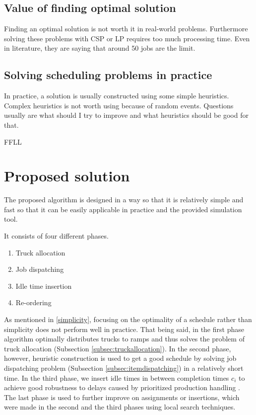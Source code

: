 \documentclass{ctuthesis}
\begin{document}
\section{Value of finding optimal solution}
Finding an optimal solution is not worth it in real-world problems. Furthermore solving these problems with CSP or LP requires too much processing time. Even in literature, they are saying that around 50 jobs are the limit. 
\section{Solving scheduling problems in practice}
In practice, a solution is usually constructed using some simple heuristics. Complex heuristics is not worth using because of random events. Questions usually are what should I try to improve and what heuristics should be good for that. 

FFLL 


\chapter{Proposed solution}
\label{ch:Proposed solution}

The proposed algorithm is designed in a way so that it is relatively simple and fast so that it can be easily applicable in practice and the provided simulation tool.

It consists of four different phases.

\begin{enumerate}
    \item Truck allocation
    \item Job dispatching
    \item Idle time insertion
    \item Re-ordering
\end{enumerate}

As mentioned in \ref{simplicity}, focusing on the optimality of a schedule rather than simplicity does not perform well in practice. That being said, in the first phase algorithm optimally distributes trucks to ramps and thus solves the problem of truck allocation (Subsection \ref{subsec:truckallocation}). In the second phase, however, heuristic construction is used to get a good schedule by solving job dispatching problem (Subsection \ref{subsec:itemdispatching}) in a relatively short time. In the third phase, we insert idle times in between completion times $c_i$ to achieve good robustness to delays caused by prioritized production handling \cite{pinedo}. The last phase is used to further improve on assignments or insertions, which were made in the second and the third phases using local search techniques.
\end{document}
